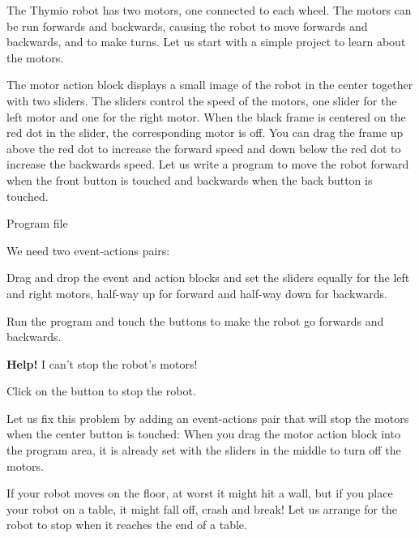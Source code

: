 \label{ch.moving}


The Thymio robot has two motors, one connected to each wheel. The motors
can be run forwards and backwards, causing the robot to move forwards
and backwards, and to make turns. Let us start with a simple project to
learn about the motors.

The motor action block  displays a small image of
the robot in the center together with two sliders. The sliders control
the speed of the motors, one slider for the left motor and one for the
right motor. When the black frame is centered on the red dot in the
slider, the corresponding motor is off. You can drag the frame up above
the red dot to increase the forward speed and down below the red dot to
increase the backwards speed. Let us write a program to move the robot
forward when the front button is touched and backwards when the back
button is touched.

{\raggedleft \hfill Program file }

We need two event-actions pairs:

\begin{center}
\end{center}

Drag and drop the event and action blocks and set the sliders equally
for the left and right motors, half-way up for forward and half-way down
for backwards.

Run the program and touch the buttons to make the robot go forwards and
backwards.


\textbf{Help!} I can't stop the robot's motors!

Click on the button  to stop the robot.

\newpage

Let us fix this problem by adding an event-actions pair that will stop
the motors when the center button is touched:
When you drag the motor action block into the program area, it is
already set with the sliders in the middle to turn off the motors.


If your robot moves on the floor, at worst it might hit a wall, but if
you place your robot on a table, it might fall off, crash and break! Let
us arrange for the robot to stop when it reaches the end of a table.

